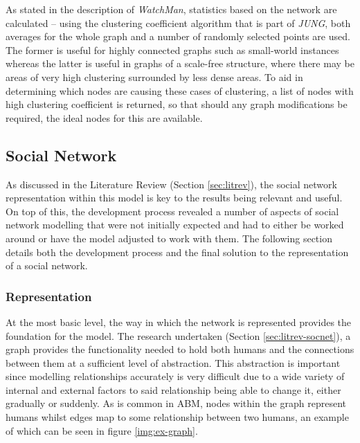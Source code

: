 \documentclass[]{report}
\begin{document}
As stated in the description of \emph{WatchMan}, statistics based on the network are calculated – using the clustering coefficient algorithm that is part of \emph{JUNG}, both averages for the whole graph and a number of randomly selected points are used. The former is useful for highly connected graphs such as small-world instances whereas the latter is useful in graphs of a scale-free structure, where there may be areas of very high clustering surrounded by less dense areas. To aid in determining which nodes are causing these cases of clustering, a list of nodes with high clustering coefficient is returned, so that should any graph modifications be required, the ideal nodes for this are available.

\subsection{Social Network}
\label{sec:socnet}
As discussed in the Literature Review (Section \ref{sec:litrev}), the social network representation within this model is key to the results being relevant and useful. On top of this, the development process revealed a number of aspects of social network modelling that were not initially expected and had to either be worked around or have the model adjusted to work with them. The following section details both the development process and the final solution to the representation of a social network.

\subsubsection{Representation}

At the most basic level, the way in which the network is represented provides the foundation for the model. The research undertaken (Section \ref{sec:litrev-socnet}), a graph provides the functionality needed to hold both humans and the connections between them at a sufficient level of abstraction. This abstraction is important since modelling relationships accurately is very difficult due to a wide variety of internal and external factors to said relationship being able to change it, either gradually or suddenly. As is common in ABM, nodes within the graph represent humans whilst edges map to some relationship between two humans, an example of which can be seen in figure \ref{img:ex-graph}.
\end{document}
